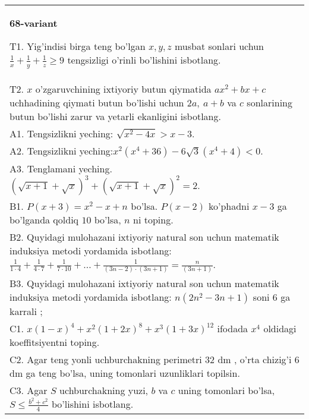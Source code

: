 \documentclass{article}
\begin{document}
\begin{tabular}{m{17cm}}
\textbf{68-variant}
\newline

T1. Yig'indisi birga teng bo'lgan \(x,y,z\) musbat sonlari uchun \(\frac{1}{x} + \frac{1}{y} + \frac{1}{z} \geq 9\) tengsizligi o'rinli bo'lishini isbotlang. \\
T2. \(x\) o'zgaruvchining ixtiyoriy butun qiymatida \(ax^{2} + bx + c\) uchhadining qiymati butun bo'lishi uchun \(2a,\ a + b\) va \(c\) sonlarining butun bo'lishi zarur va yetarli ekanligini isbotlang. \\
A1. Tengsizlikni yeching: \(\sqrt{x^{2} - 4x} > x - 3\). \\
A2. Tengsizlikni yeching:\(x^{2}\left( x^{4} + 36 \right) - 6\sqrt{3}\left( x^{4} + 4 \right) < 0\). \\
A3. Tenglamani yeching. \((\sqrt{x + 1} + \sqrt{x})^{3} + (\sqrt{x + 1} + \sqrt{x})^{2} = 2\). \\
B1. \(P(x + 3) = x^{2} - x + n\) bo'lsa. \(P(x - 2)\) ko'phadni \(x - 3\) ga bo'lganda qoldiq \(10\) bo'lsa, \(n\) ni toping. \\
B2. Quyidagi mulohazani ixtiyoriy natural son uchun matematik induksiya metodi yordamida isbotlang: \(\frac{1}{1 \cdot 4} + \frac{1}{4 \cdot 7} + \frac{1}{7 \cdot 10} + \ldots + \frac{1}{(3n - 2) \cdot (3n + 1)} = \frac{n}{(3n + 1)}\). \\
B3. Quyidagi mulohazani ixtiyoriy natural son uchun matematik induksiya metodi yordamida isbotlang: \(n\left( 2n^{2} - 3n + 1 \right)\) soni 6 ga karrali ; \\
C1. \(x(1 - x)^{4} + x^{2}(1 + 2x)^{8} + x^{3}(1 + 3x)^{12}\) ifodada \(x^{4}\) oldidagi koeffitsiyentni toping. \\
C2. Agar teng yonli uchburchakning perimetri 32 dm , o'rta chizig'i 6 dm ga teng bo'lsa, uning tomonlari uzunliklari topilsin. \\
C3. Agar \(S\) uchburchakning yuzi, \(b\) va \(c\) uning tomonlari bo'lsa, \(S \leq \frac{b^{2} + c^{2}}{4}\) bo'lishini isbotlang. \\

\end{tabular}
\vspace{1cm}
\end{document}
